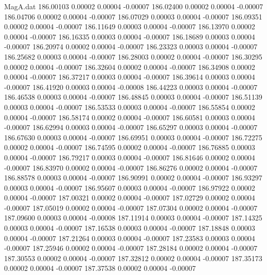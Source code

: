 \begin{filecontents}{MagA.dat}
 186.00103    0.00002    0.00004   -0.00007
 186.02400    0.00002    0.00004   -0.00007
 186.04706    0.00002    0.00004   -0.00007
 186.07029    0.00003    0.00004   -0.00007
 186.09351    0.00002    0.00004   -0.00007
 186.11649    0.00003    0.00004   -0.00007
 186.13970    0.00002    0.00004   -0.00007
 186.16335    0.00003    0.00004   -0.00007
 186.18689    0.00003    0.00004   -0.00007
 186.20974    0.00002    0.00004   -0.00007
 186.23323    0.00003    0.00004   -0.00007
 186.25682    0.00003    0.00004   -0.00007
 186.28003    0.00002    0.00004   -0.00007
 186.30295    0.00002    0.00004   -0.00007
 186.32604    0.00002    0.00004   -0.00007
 186.34908    0.00002    0.00004   -0.00007
 186.37217    0.00003    0.00004   -0.00007
 186.39614    0.00003    0.00004   -0.00007
 186.41920    0.00003    0.00004   -0.00008
 186.44223    0.00003    0.00004   -0.00007
 186.46538    0.00003    0.00004   -0.00007
 186.48845    0.00003    0.00004   -0.00007
 186.51139    0.00003    0.00004   -0.00007
 186.53533    0.00003    0.00004   -0.00007
 186.55854    0.00002    0.00004   -0.00007
 186.58174    0.00002    0.00004   -0.00007
 186.60581    0.00003    0.00004   -0.00007
 186.62994    0.00003    0.00004   -0.00007
 186.65297    0.00003    0.00004   -0.00007
 186.67630    0.00003    0.00004   -0.00007
 186.69951    0.00003    0.00004   -0.00007
 186.72275    0.00002    0.00004   -0.00007
 186.74595    0.00002    0.00004   -0.00007
 186.76885    0.00003    0.00004   -0.00007
 186.79217    0.00003    0.00004   -0.00007
 186.81646    0.00002    0.00004   -0.00007
 186.83970    0.00002    0.00004   -0.00007
 186.86276    0.00002    0.00004   -0.00007
 186.88578    0.00003    0.00004   -0.00007
 186.90991    0.00002    0.00004   -0.00007
 186.93297    0.00003    0.00004   -0.00007
 186.95607    0.00003    0.00004   -0.00007
 186.97922    0.00002    0.00004   -0.00007
 187.00321    0.00002    0.00004   -0.00007
 187.02729    0.00002    0.00004   -0.00007
 187.05019    0.00002    0.00004   -0.00007
 187.07304    0.00002    0.00004   -0.00007
 187.09600    0.00003    0.00004   -0.00008
 187.11914    0.00003    0.00004   -0.00007
 187.14325    0.00003    0.00004   -0.00007
 187.16538    0.00003    0.00004   -0.00007
 187.18848    0.00003    0.00004   -0.00007
 187.21264    0.00003    0.00004   -0.00007
 187.23583    0.00003    0.00004   -0.00007
 187.25946    0.00002    0.00004   -0.00007
 187.28184    0.00002    0.00004   -0.00007
 187.30553    0.00002    0.00004   -0.00007
 187.32812    0.00002    0.00004   -0.00007
 187.35173    0.00002    0.00004   -0.00007
 187.37538    0.00002    0.00004   -0.00007

\end{filecontents}
